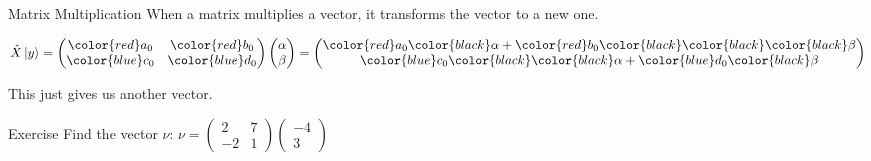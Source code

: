 \documentclass{beamer}
\begin{document}
\begin{frame}{Matrix Multiplication}
When a matrix multiplies a vector, it transforms the vector to a new one.\vfill
    \begin{center}
        
    \begin{math}
        \hat{X}\ket{y} = \begin{pmatrix}
            \color{red} a_0 & \color{red} b_0 \\ \color{blue} c_0 & \color{blue} d_0
            \end{pmatrix} 
            \begin{pmatrix}
                \alpha \\ \beta    
            \end{pmatrix}
            =
            \begin{pmatrix}
                \color{red} a_0 \color{black}\alpha + \color{red} b_0 \color{black}\color{black}\color{black}\beta \\
                \color{blue} c_0 \color{black}\color{black}\alpha + \color{blue} d_0 \color{black}\beta \\       
            \end{pmatrix}
    \end{math}
    \end{center}
    \vfill
    This just gives us another vector.
    \begin{block}{Exercise}
        Find the vector $\nu$:\vfill
        \centering
        \begin{math}
        \nu=
            \begin{pmatrix}
                2 & 7 \\ -2 & 1
            \end{pmatrix}
            \begin{pmatrix}
                -4 \\ 3
            \end{pmatrix}
        \end{math}
    \end{block}
\end{frame}
\end{document}
